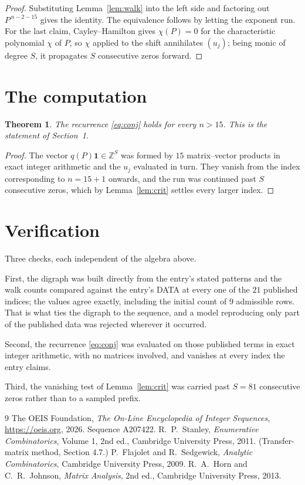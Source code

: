 \documentclass[11pt,a4paper]{article}
\theoremstyle{plain}
\newtheorem{theorem}{Theorem}
\theoremstyle{definition}
\begin{document}
\begin{proof}
Substituting Lemma~\ref{lem:walk} into the left side and factoring out
$P^{\,n-2-15}$ gives the identity. The equivalence follows by letting the exponent
run. For the last claim, Cayley--Hamilton gives $\chi(P)=0$ for the characteristic
polynomial $\chi$ of $P$, so $\chi$ applied to the shift annihilates $(u_j)$; being monic of
degree $S$, it propagates $S$ consecutive zeros forward.
\end{proof}

\section{The computation}

\begin{theorem}
The recurrence \eqref{eq:conj} holds for every $n>15$. This is the statement of
Section~1.
\end{theorem}

\begin{proof}
The vector $q(P)\mathbf{1}\in\mathbb{Z}^{S}$ was formed by $15$ matrix--vector
products in exact integer arithmetic and the $u_j$ evaluated in turn. They vanish from the
index corresponding to $n=15+1$ onwards, and the run was continued past $S$ consecutive
zeros, which by Lemma~\ref{lem:crit} settles every larger index.
\end{proof}

\section{Verification}

Three checks, each independent of the algebra above.

First, the digraph was built directly from the entry's stated patterns and the walk counts
compared against the entry's DATA at every one of the $21$ published indices; the
values agree exactly, including the initial count of $9$ admissible rows. That is
what ties the digraph to the sequence, and a model reproducing only part of the published
data was rejected wherever it occurred.

Second, the recurrence \eqref{eq:conj} was evaluated on those published terms in exact
integer arithmetic, with no matrices involved, and vanishes at every index the entry claims.

Third, the vanishing test of Lemma~\ref{lem:crit} was carried past $S=81$ consecutive
zeros rather than to a sampled prefix.

\begin{thebibliography}{9}
 The OEIS Foundation, \emph{The On-Line Encyclopedia of Integer
Sequences}, \url{https://oeis.org}, 2026. Sequence A207422.
 R.~P.~Stanley, \emph{Enumerative Combinatorics}, Volume 1, 2nd ed.,
Cambridge University Press, 2011. (Transfer-matrix method, Section 4.7.)
 P.~Flajolet and R.~Sedgewick, \emph{Analytic Combinatorics}, Cambridge
University Press, 2009.
 R.~A.~Horn and C.~R.~Johnson, \emph{Matrix Analysis}, 2nd ed., Cambridge
University Press, 2013.
\end{thebibliography}
\end{document}
